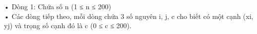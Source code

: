 • Dòng 1: Chứa số n (1 ≤ n ≤ 200)   
\\   • Các dòng tiếp theo, mỗi dòng chứa 3 số nguyên i, j, c cho biết có một cạnh (xi, yj) và trọng số cạnh đó là c (0 ≤ c ≤ 200).  

\